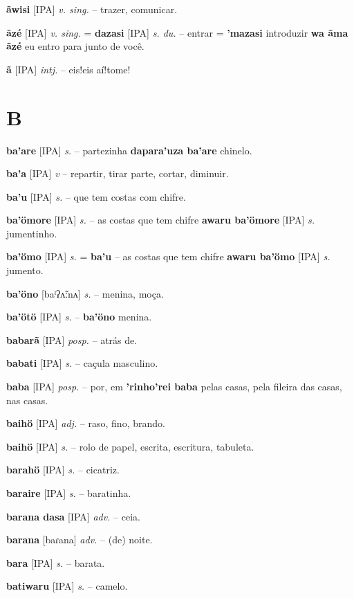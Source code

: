 \textbf{ãwisi} [IPA] \textit{v. sing.} -- trazer, comunicar.

\textbf{ãzé} [IPA] \textit{v. sing.} = \textbf{dazasi} [IPA] \textit{s. du.} -- entrar  = \textbf{'mazasi} introduzir  \textbf{wa ãma ãzé} eu entro para junto de você.

\textbf{ã} [IPA] \textit{intj.} -- eis!eis aí!tome!


\section*{B}


\textbf{ba'are} [IPA] \textit{s.} -- partezinha  \textbf{dapara'uza ba'are} chinelo.

\textbf{ba'a} [IPA] \textit{v} -- repartir, tirar parte, cortar, diminuir.

\textbf{ba'u} [IPA] \textit{s.} -- que tem costas com chifre.

\textbf{ba'ömore} [IPA] \textit{s.} -- as costas que tem chifre  \textbf{awaru ba'ömore} [IPA] \textit{s.} jumentinho.

\textbf{ba'ömo} [IPA] \textit{s.} = \textbf{ba'u} -- as costas que tem chifre  \textbf{awaru ba'ömo} [IPA] \textit{s.} jumento.

\textbf{ba'öno} [baˡʔʌ̃ːnʌ] \textit{s.} -- menina, moça.

\textbf{ba'ötö} [IPA] \textit{s.} -- \textbf{ba'öno} menina.

\textbf{babarã} [IPA] \textit{posp.} -- atrás de.

\textbf{babati} [IPA] \textit{s.} -- caçula masculino.

\textbf{baba} [IPA] \textit{posp.} -- por, em  \textbf{'rinho'rei baba} pelas casas, pela fileira das casas, nas casas.

\textbf{baihö} [IPA] \textit{adj.} -- raso, fino, brando.

\textbf{baihö} [IPA] \textit{s.} -- rolo de papel, escrita, escritura, tabuleta.

\textbf{barahö} [IPA] \textit{s.} -- cicatriz.

\textbf{baraire} [IPA] \textit{s.} -- baratinha.

\textbf{barana dasa} [IPA] \textit{adv.} -- ceia.

\textbf{barana} [baɾana] \textit{adv.} -- (de) noite.

\textbf{bara} [IPA] \textit{s.} -- barata.

\textbf{batiwaru} [IPA] \textit{s.} -- camelo.

